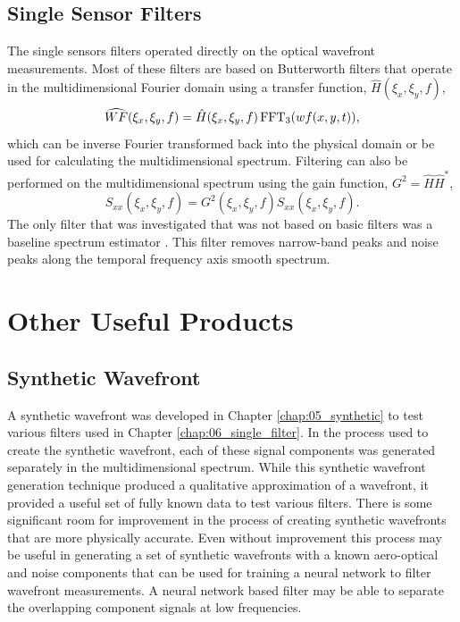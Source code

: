 \subsection{Single Sensor Filters}
The single sensors filters operated directly on the optical wavefront measurements.
Most of these filters are based on Butterworth filters \cite{Butterworth-1930-DvDrjKha} that operate in the multidimensional Fourier domain using a transfer function, $\hat{H}(\xi_x,\xi_y,f)$,
\begin{equation}
  \widehat{WF}(\xi_x,\xi_y,f) = \hat{H}(\xi_x,\xi_y,f)\operatorname{FFT_3}(wf(x,y,t)) \textrm{,}
\end{equation}
which can be inverse Fourier transformed back into the physical domain or be used for calculating the multidimensional spectrum.
Filtering can also be performed on the multidimensional spectrum using the gain function, $G^2 = \hat{H}\hat{H}^*$,
\begin{equation}
  S_{xx}(\xi_x,\xi_y,f) = G^2(\xi_x,\xi_y,f)S_{xx}(\xi_x,\xi_y,f) \textrm{.}
\end{equation}
The only filter that was investigated that was not based on basic filters was a baseline spectrum estimator \cite{Schulze-2012-GmyAqzC7}.
This filter removes narrow-band peaks and noise peaks along the temporal frequency axis smooth spectrum.

\section{Other Useful Products}

\subsection{Synthetic Wavefront}
A synthetic wavefront was developed in Chapter \ref{chap:05_synthetic} to test various filters used in Chapter \ref{chap:06_single_filter}.
In the process used to create the synthetic wavefront, each of these signal components was generated separately in the multidimensional spectrum.
While this synthetic wavefront generation technique produced a qualitative approximation of a wavefront, it provided a useful set of fully known data to test various filters.
There is some significant room for improvement in the process of creating synthetic wavefronts that are more physically accurate.
Even without improvement this process may be useful in generating a set of synthetic wavefronts with a known aero-optical and noise components that can be used for training a neural network to filter \cite{Lo-1994-W6aWeuaT} wavefront measurements.
A neural network based filter may be able to separate the overlapping component signals at low frequencies.

